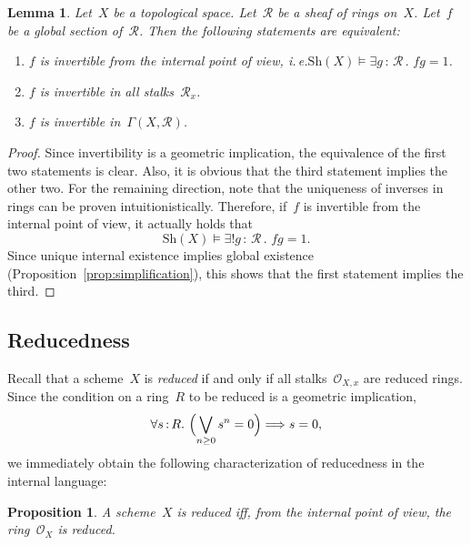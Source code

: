 \documentclass[10pt]{amsart}
\makeatletter
\theoremstyle{definition}
\theoremstyle{plain}
\newtheorem{prop}[defn]{Proposition}
\newtheorem{lemma}[defn]{Lemma}
\theoremstyle{remark}
\renewcommand{\O}{\mathcal{O}}
\newcommand{\R}{\mathcal{R}}
\newcommand{\Sh}{\mathrm{Sh}}
\newcommand{\?}{\,{:}\,}
\renewcommand{\_}{\mathpunct{.}\,}
\newcommand{\ie}{i.\,e.\@\xspace}
\makeatother
\begin{document}
\begin{lemma}Let~$X$ be a topological space. Let~$\R$ be a sheaf of rings
on~$X$. Let~$f$ be a global section of~$\R$. Then the following statements are
equivalent:
\begin{enumerate}
\item $f$ is invertible from the internal point of view, \ie $\Sh(X) \models
\exists g\?\R\_ fg = 1$.
\item $f$ is invertible in all stalks~$\R_x$.
\item $f$ is invertible in~$\Gamma(X,\R)$.
\end{enumerate}
\end{lemma}
\begin{proof}Since invertibility is a geometric implication, the equivalence of
the first two statements is clear. Also, it is obvious that the third statement
implies the other two. For the remaining direction, note that the
uniqueness of inverses in rings can be proven intuitionistically. Therefore, if~$f$ is invertible
from the internal point of view, it actually holds that
\[ \Sh(X) \models \exists! g\?\R\_ fg = 1. \]
Since unique internal existence implies global existence
(Proposition~\ref{prop:simplification}), this shows that the first statement
implies the third.
\end{proof}


\subsection{Reducedness}\label{sect:reducedness} Recall that a scheme~$X$ is \emph{reduced} if and only
if all stalks~$\O_{X,x}$ are reduced rings. Since the condition on a ring~$R$
to be reduced is a geometric implication,
\[ \forall s\?R\_ \Bigl(\bigvee_{n \geq 0} s^n = 0\Bigr) \Longrightarrow s = 0, \]
we immediately obtain the following characterization of reducedness in the
internal language:
\begin{prop}\label{prop:reduced-ring}
A scheme~$X$ is reduced iff, from the internal point of view, the
ring~$\O_X$ is reduced.\end{prop}
\end{document}
